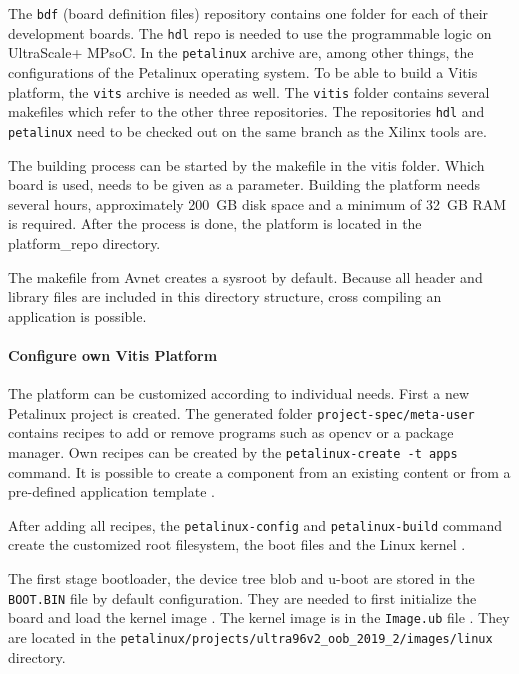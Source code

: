 The \texttt{bdf} (board definition files) repository contains one folder for each of their development boards.
The \texttt{hdl} repo is needed to use the programmable logic on UltraScale+ MPsoC.
In the \texttt{petalinux} archive are, among other things, the configurations of the Petalinux operating system.
To be able to build a Vitis platform, the \texttt{vits} archive is needed as well.
The \texttt{vitis} folder contains several makefiles which refer to the other three repositories.
The repositories \texttt{hdl} and \texttt{petalinux} need to be checked out on the same branch as the Xilinx tools are.

The building process can be started by the makefile in the vitis folder.
Which board is used, needs to be given as a parameter.
Building the platform needs several hours, approximately \SI{200}{GB} disk space and a minimum of \SI{32}{GB} RAM is required.
After the process is done, the platform is located in the platform\_repo directory.

The makefile from Avnet creates a sysroot by default.
Because all header and library files are included in this directory structure, cross compiling an application is possible.

\paragraph{Configure own Vitis Platform}
The platform can be customized according to individual needs.
First a new Petalinux project is created.
The generated folder \texttt{project-spec/meta-user} contains recipes to add or remove programs such as \acrshort{opencv} or a package manager.
Own recipes can be created by the \texttt{petalinux-create -t apps} command.
It is possible to create a component from an existing content or from a pre-defined application template \cite{petalinux_commandline_guide}.

After adding all recipes, the \texttt{petalinux-config} and \texttt{petalinux-build} command create the customized root filesystem, the boot files and the Linux kernel \cite{petalinux_user_guide}.

The first stage bootloader, the device tree blob and u-boot are stored in the \texttt{BOOT.BIN} file by default configuration.
They are needed to first initialize the board and load the kernel image \cite{xilinx_wiki_boot}.
The kernel image is in the \texttt{Image.ub} file \cite{xilinx_wiki_uboot}.
They are located in the \texttt{petalinux/projects/ultra96v2\_oob\_2019\_2/images/linux} directory.


